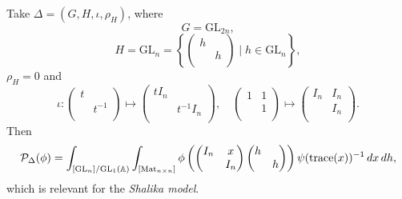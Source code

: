 \documentclass[reqno]{amsart} 
\numberwithin{theorem}{section}
\numberwithin{equation}{section}
\numberwithin{exercise}{section}
\begin{document}
\begin{example}\label{example:cq6tho3o9b}
  Take $\Delta =(G, H, \iota, \rho_H)$, where
  \begin{equation*}
    G =\mathrm{GL}_{2 n},
  \end{equation*}
  \begin{equation*}
    H = \mathrm{GL}_n = \left\{
      \begin{pmatrix}
        h        &  \\
                 & h \\
      \end{pmatrix} \mid h \in \mathrm{GL}_n \right\},
  \end{equation*}
  $\rho_H = 0$ and
  \begin{equation*}
    \iota :
    \begin{pmatrix}
      t      &  \\
             & t^{-1} \\
    \end{pmatrix}
    \mapsto
    \begin{pmatrix}
      t I_n &  \\
            & t^{-1} I_n \\
    \end{pmatrix},
    \quad
    \begin{pmatrix}
      1 & 1 \\
        & 1 \\
    \end{pmatrix}
    \mapsto
    \begin{pmatrix}
      I_n      & I_n \\
               & I_n \\
    \end{pmatrix}.
  \end{equation*}
  Then
  \begin{equation*}
    \mathcal{P}_\Delta(\phi) =
    \int_{[\mathrm{GL}_n] / \mathrm{GL}_1(\mathbb{A})}
    \int_{[\operatorname{Mat}_{n \times n}]} \phi \left(
      \begin{pmatrix}
        I_n      & x \\
                 & I_n \\
      \end{pmatrix}
      \begin{pmatrix}
        h &  \\
          & h \\
      \end{pmatrix}      
    \right)
    \psi(\operatorname{trace}(x))^{-1} \, d x
    \, d h,
  \end{equation*}
  which is relevant for the \emph{Shalika model}.
\end{example}
\end{document}
